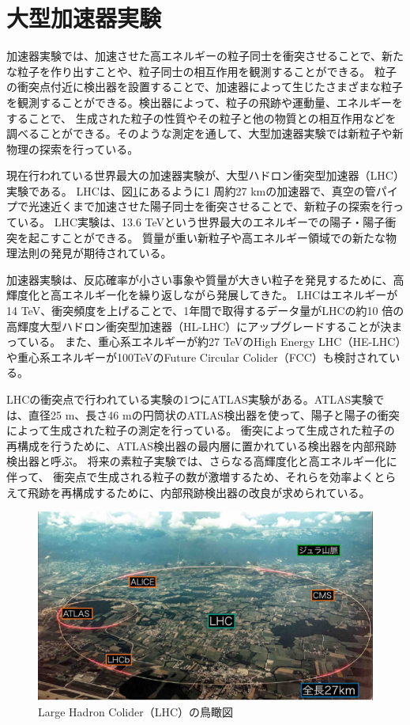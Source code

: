 \section{大型加速器実験}
加速器実験では、加速させた高エネルギーの粒子同士を衝突させることで、新たな粒子を作り出すことや、粒子同士の相互作用を観測することができる。
粒子の衝突点付近に検出器を設置することで、加速器によって生じたさまざまな粒子を観測することができる。検出器によって、粒子の飛跡や運動量、エネルギーをすることで、
生成された粒子の性質やその粒子と他の物質との相互作用などを調べることができる。そのような測定を通して、大型加速器実験では新粒子や新物理の探索を行っている。

現在行われている世界最大の加速器実験が、大型ハドロン衝突型加速器（LHC）実験である。
LHCは、図\ref{fg:LHC}にあるように1 周約27 kmの加速器で、真空の管パイプで光速近くまで加速させた陽子同士を衝突させることで、新粒子の探索を行っている。
LHC実験は、13.6 TeVという世界最大のエネルギーでの陽子・陽子衝突を起こすことができる。
質量が重い新粒子や高エネルギー領域での新たな物理法則の発見が期待されている。

加速器実験は、反応確率が小さい事象や質量が大きい粒子を発見するために、高輝度化と高エネルギー化を繰り返しながら発展してきた。
LHCはエネルギーが14 TeV、衝突頻度を上げることで、1年間で取得するデータ量がLHCの約10 倍の高輝度大型ハドロン衝突型加速器（HL-LHC）にアップグレードすることが決まっている。
また、重心系エネルギーが約27 TeVのHigh Energy LHC（HE-LHC）や重心系エネルギーが100TeVのFuture Circular Colider（FCC）も検討されている。

LHCの衝突点で行われている実験の1つにATLAS実験がある。ATLAS実験では、直径25 m、長さ46 mの円筒状のATLAS検出器を使って、陽子と陽子の衝突によって生成された粒子の測定を行っている。
衝突によって生成された粒子の再構成を行うために、ATLAS検出器の最内層に置かれている検出器を内部飛跡検出器と呼ぶ。
将来の素粒子実験では、さらなる高輝度化と高エネルギー化に伴って、
衝突点で生成される粒子の数が激増するため、それらを効率よくとらえて飛跡を再構成するために、内部飛跡検出器の改良が求められている。

\begin{figure}[h]
    \centering
    \includegraphics[width=12cm]{fig/ch1/LHC.jpg}
    \caption{Large Hadron Colider（LHC）の鳥瞰図\cite{LHCphoto}}
    \label{fg:LHC}
\end{figure}